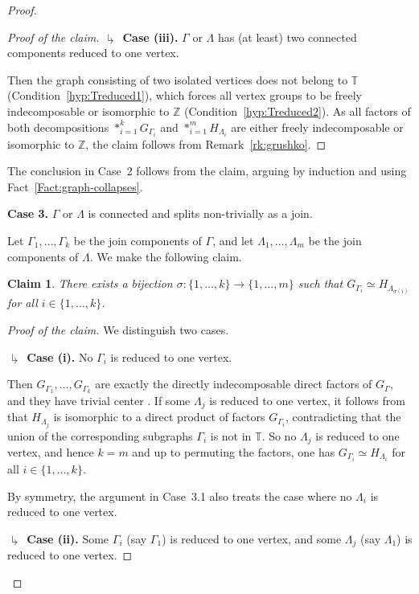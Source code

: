 \documentclass[a4paper,english,11pt]{article}
\newtheorem{claim}[de]{Claim}
\theoremstyle{definition}
\theoremstyle{remark}
\newcommand{\bZ}{\mathbb{Z}}
\begin{document}
\begin{proof}
\begin{proof}[Proof of the claim]
\textbf{$\drsh$ Case (iii).} $\Gamma$ or $\Lambda$ has (at least) two connected components reduced to one vertex. 

Then the graph consisting of two isolated vertices does not belong to $\mathbb{T}$ (Condition~\ref{hyp:Treduced1}), which forces all vertex groups to be freely indecomposable or isomorphic to $\bZ$ (Condition~\ref{hyp:Treduced2}). As all factors of both decompositions $*^k_{i=1}G_{\Gamma_i}$ and $*^m_{i=1} H_{\Lambda_i}$ are either freely indecomposable or isomorphic to $\bZ$, the claim follows from Remark~\ref{rk:grushko}.
\end{proof}

The conclusion in Case~2 follows from the claim, arguing by induction and using Fact~\ref{Fact:graph-collapses}.
\medskip

\textbf{Case 3.} $\Gamma$ or $\Lambda$ is connected and splits non-trivially as a join.
\smallskip 

Let $\Gamma_1,\dots,\Gamma_k$ be the join components of $\Gamma$, and let $\Lambda_1,\dots,\Lambda_m$ be the join components of $\Lambda$. We make the following claim.

\begin{claim}
There exists a bijection $\sigma:\{1,\dots,k\}\to\{1,\dots,m\}$ such that $G_{\Gamma_i}\simeq H_{\Lambda_{\sigma(i)}}$ for all $i\in\{1,\dots,k\}$.
\end{claim}

\begin{proof}[Proof of the claim] 
We distinguish two cases.
\smallskip 

\textbf{$\drsh$ Case (i).} No $\Gamma_i$ is reduced to one vertex. 

Then $G_{\Gamma_1},\dots,G_{\Gamma_k}$ are exactly the directly indecomposable direct factors of $G_\Gamma$, and they have trivial center \cite[Theorem~3.34]{Gre}. If some $\Lambda_j$ is reduced to one vertex, it follows from \cite[Proposition~2]{CdlH} that $H_{\Lambda_j}$ is isomorphic to a direct product of factors $G_{\Gamma_i}$, contradicting that the union of the corresponding subgraphs $\Gamma_i$ is not in $\mathbb{T}$. So no $\Lambda_j$ is reduced to one vertex, and hence $k=m$ and up to permuting the factors, one has $G_{\Gamma_i}\simeq H_{\Lambda_i}$ for all $i\in \{1,\dots,k\}$.
\medskip

By symmetry, the argument in Case~3.1 also treats the case where no $\Lambda_i$ is reduced to one vertex.
\medskip

\textbf{$\drsh$ Case (ii).} Some $\Gamma_i$ (say $\Gamma_1$) is reduced to one vertex, and some $\Lambda_j$ (say $\Lambda_1$) is reduced to one vertex. 


\end{proof}
\end{proof}
\end{document}
